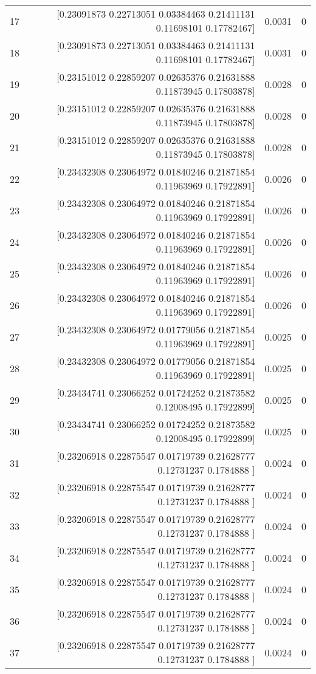 \begin{longtable}{lrrr}
17 & [0.23091873 0.22713051 0.03384463 0.21411131 0.11698101 0.17782467] & 0.0031 & 0 \\
18 & [0.23091873 0.22713051 0.03384463 0.21411131 0.11698101 0.17782467] & 0.0031 & 0 \\
19 & [0.23151012 0.22859207 0.02635376 0.21631888 0.11873945 0.17803878] & 0.0028 & 0 \\
20 & [0.23151012 0.22859207 0.02635376 0.21631888 0.11873945 0.17803878] & 0.0028 & 0 \\
21 & [0.23151012 0.22859207 0.02635376 0.21631888 0.11873945 0.17803878] & 0.0028 & 0 \\
22 & [0.23432308 0.23064972 0.01840246 0.21871854 0.11963969 0.17922891] & 0.0026 & 0 \\
23 & [0.23432308 0.23064972 0.01840246 0.21871854 0.11963969 0.17922891] & 0.0026 & 0 \\
24 & [0.23432308 0.23064972 0.01840246 0.21871854 0.11963969 0.17922891] & 0.0026 & 0 \\
25 & [0.23432308 0.23064972 0.01840246 0.21871854 0.11963969 0.17922891] & 0.0026 & 0 \\
26 & [0.23432308 0.23064972 0.01840246 0.21871854 0.11963969 0.17922891] & 0.0026 & 0 \\
27 & [0.23432308 0.23064972 0.01779056 0.21871854 0.11963969 0.17922891] & 0.0025 & 0 \\
28 & [0.23432308 0.23064972 0.01779056 0.21871854 0.11963969 0.17922891] & 0.0025 & 0 \\
29 & [0.23434741 0.23066252 0.01724252 0.21873582 0.12008495 0.17922899] & 0.0025 & 0 \\
30 & [0.23434741 0.23066252 0.01724252 0.21873582 0.12008495 0.17922899] & 0.0025 & 0 \\
31 & [0.23206918 0.22875547 0.01719739 0.21628777 0.12731237 0.1784888 ] & 0.0024 & 0 \\
32 & [0.23206918 0.22875547 0.01719739 0.21628777 0.12731237 0.1784888 ] & 0.0024 & 0 \\
33 & [0.23206918 0.22875547 0.01719739 0.21628777 0.12731237 0.1784888 ] & 0.0024 & 0 \\
34 & [0.23206918 0.22875547 0.01719739 0.21628777 0.12731237 0.1784888 ] & 0.0024 & 0 \\
35 & [0.23206918 0.22875547 0.01719739 0.21628777 0.12731237 0.1784888 ] & 0.0024 & 0 \\
36 & [0.23206918 0.22875547 0.01719739 0.21628777 0.12731237 0.1784888 ] & 0.0024 & 0 \\
37 & [0.23206918 0.22875547 0.01719739 0.21628777 0.12731237 0.1784888 ] & 0.0024 & 0 \\

\end{longtable}
